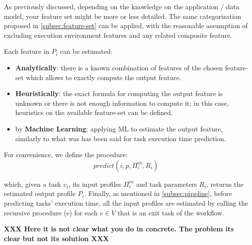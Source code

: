 \documentclass[a4paper, 10pt, conference]{ieeeconf}      %
\begin{document}
\noindent As previously discussed, depending on the knowledge on the application / data model, your feature set might be more or less detailed.
The same categorization proposed in  \ref{subsec:feature-set} can be applied, with the reasonable assumption of excluding execution environment features and any related composite feature.

Each feature in $P_i$ can be estimated:
\begin{itemize}
    \item \textbf{Analytically}: there is a known combination of features of the chosen feature-set which allows to exactly compute the output feature.
    \item \textbf{Heuristically}: the exact formula for computing the output feature is unknown or there is not enough information to compute it; in this case,  heuristics on the available feature-set can be defined.
    \item by \textbf{Machine Learning}: applying ML to estimate the output feature, similarly to what was has been said  for task execution time prediction.
\end{itemize}

\noindent For convenience, we define the procedure:
\begin{equation}
\label{eq:predict}
predict(i, p, \Pi_i^{in}, R_i)
\end{equation}

\noindent which, given a task $v_i$, its input profiles $\Pi_i^{in}$ and task parameters $R_i$, returns the estimated output profile $P_i$.
Finally, as mentioned in \ref{subsec:pipeline}, before predicting tasks' execution time, all the input profiles are  estimated by calling the recursive procedure (e) for each $e \in V$ that is an exit task of the workflow.

\textbf{XXX Here it is not clear what you do in concrete. The problem its clear but not its solution XXX}
\end{document}
